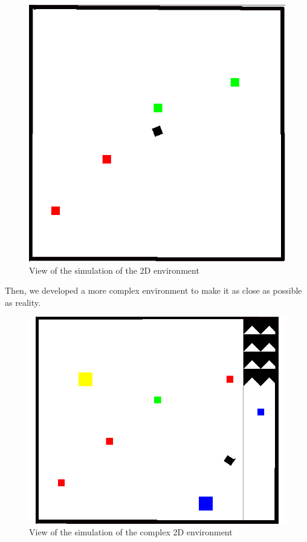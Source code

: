 \documentclass[conference]{IEEEtran}
\begin{document}
\begin{figure}
  \includegraphics[scale = 0.35]{images/2Dsimple.png}
  \caption{View of the simulation of the 2D environment}
  \label{fig:my-figure}
\end{figure}

Then, we developed a more complex environment to make it as close as possible as reality.\\

\begin{figure}
  \includegraphics[scale = 0.3]{images/2Dcomplex.png}
  \caption{View of the simulation of the complex 2D environment}
  \label{fig:my-figure}
\end{figure}
\end{document}

